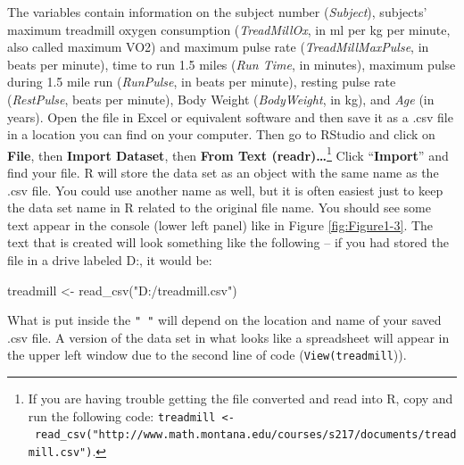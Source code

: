 \documentclass[
]{book}
\newenvironment{Shaded}{\begin{snugshade}}{\end{snugshade}}
\newcommand{\FunctionTok}[1]{\textcolor[rgb]{0.00,0.00,0.00}{#1}}
\newcommand{\NormalTok}[1]{#1}
\newcommand{\OtherTok}[1]{\textcolor[rgb]{0.56,0.35,0.01}{#1}}
\newcommand{\StringTok}[1]{\textcolor[rgb]{0.31,0.60,0.02}{#1}}
\begin{document}
\indent The variables contain information on the subject number (\emph{Subject}), subjects'
maximum treadmill oxygen consumption (\emph{TreadMillOx}, in ml per kg per minute, also called maximum VO2) and
maximum pulse rate (\emph{TreadMillMaxPulse}, in beats per minute), time to run 1.5
miles (\emph{Run Time}, in minutes), maximum pulse
during 1.5 mile run (\emph{RunPulse}, in beats per minute), resting pulse rate
(\emph{RestPulse}, beats per minute), Body Weight (\emph{BodyWeight}, in kg), and \emph{Age}
(in years). Open the file in Excel or equivalent software and then save it as
a .csv file in a location you can find on your computer. Then go to RStudio
and click on \textbf{File}, then \textbf{Import Dataset}, then \textbf{From Text (readr)\ldots{}}\footnote{If
  you are having trouble getting the file converted and read into R, copy and
  run the following code:
  \texttt{treadmill\ \textless{}-\ read\_csv("http://www.math.montana.edu/courses/s217/documents/treadmill.csv")}.}
Click ``\textbf{Import}'' and find your file. R will store the data set as an object with the same name
as the .csv file. You could use another name as well, but it is
often easiest just to keep the data
set name in R related to the original file name. You should see some text appear
in the console (lower left panel) like in Figure \ref{fig:Figure1-3}. The text
that is created
will look something like the following -- if you had stored the file in a drive
labeled D:, it would be:

\begin{Shaded}
\begin{Highlighting}[]
\NormalTok{treadmill }\OtherTok{\textless{}{-}} \FunctionTok{read\_csv}\NormalTok{(}\StringTok{"D:/treadmill.csv"}\NormalTok{)}
\end{Highlighting}
\end{Shaded}

What is put inside the
\texttt{"\ "} will depend on the location and name of your saved .csv file. A
version of the data set in what looks like a
spreadsheet will appear in the upper left window due to the second line of
code (\texttt{View(treadmill})).
\end{document}
